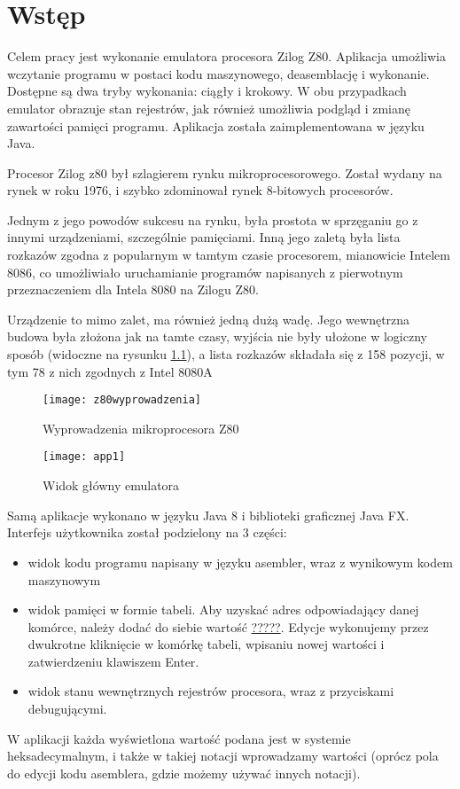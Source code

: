 \chapter{Wstęp}

	Celem pracy jest wykonanie emulatora procesora Zilog Z80. Aplikacja umożliwia wczytanie programu w postaci kodu maszynowego, deasemblację i wykonanie. Dostępne są dwa tryby wykonania: ciągły i krokowy. W obu przypadkach emulator obrazuje stan rejestrów, jak również umożliwia podgląd i zmianę zawartości pamięci programu. Aplikacja została zaimplementowana w języku Java.
	
	Procesor Zilog z80 był szlagierem rynku mikroprocesorowego. \cite{karczmarczuk}
	Został wydany na rynek w roku 1976, i szybko zdominował rynek 8-bitowych procesorów.
	
	Jednym z jego powodów sukcesu na rynku, była prostota w sprzęganiu go z innymi urządzeniami, szczególnie pamięciami. Inną jego zaletą była lista rozkazów zgodna z popularnym w tamtym czasie procesorem, mianowicie Intelem 8086, co umożliwiało uruchamianie programów napisanych z pierwotnym przeznaczeniem dla Intela 8080 na Zilogu Z80. \cite{karczmarczuk}
	
	Urządzenie to mimo zalet, ma również jedną dużą wadę. Jego wewnętrzna budowa była złożona jak na tamte czasy, wyjścia nie były ułożone w logiczny sposób (widoczne na rysunku  \ref{img:z80wyprowadzenia}), a lista rozkazów składała się z 158 pozycji, w tym 78 z nich zgodnych z Intel 8080A \cite{manual}
	
	
	\begin{figure}[h]
		\centering
		\texttt{[image: z80wyprowadzenia]}
		\caption{Wyprowadzenia mikroprocesora Z80 \cite{karczmarczuk}}
		\label{img:z80wyprowadzenia}
	\end{figure}
			
	\begin{figure}[h]		
		\centering
		\texttt{[image: app1]}
		\caption{Widok główny emulatora}
	\end{figure}
	
	Samą aplikacje wykonano w języku Java 8 i biblioteki graficznej Java FX. 
	Interfejs użytkownika został podzielony na 3 części: 
	\begin{itemize}  
		\item widok kodu programu napisany w języku asembler, wraz z  wynikowym kodem maszynowym  
		\item widok pamięci w formie tabeli. Aby uzyskać adres odpowiadający danej komórce, należy dodać do siebie wartość \underline{?????}. Edycje wykonujemy przez dwukrotne kliknięcie w komórkę tabeli, wpisaniu nowej wartości i zatwierdzeniu klawiszem Enter.
		\item widok stanu wewnętrznych rejestrów procesora, wraz z przyciskami debugującymi.   
	\end{itemize}
	
	W aplikacji każda wyświetlona wartość podana jest w systemie heksadecymalnym, i także w takiej notacji wprowadzamy wartości (oprócz pola do edycji kodu asemblera, gdzie możemy używać innych notacji).
	